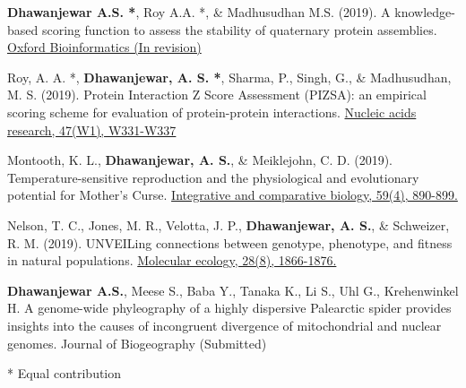 


\begin{cvpubs}

  \pubentry
    {\textbf{Dhawanjewar A.S. *}, Roy A.A. *, \& Madhusudhan M.S. (2019).}
	{A knowledge-based scoring function to assess the stability of quaternary protein assemblies.}
	{\href{https://doi.org/10.1101/562520}{Oxford Bioinformatics (In revision)}} 
	
  \pubentry
     {Roy, A. A. *, \textbf{Dhawanjewar, A. S. *}, Sharma, P., Singh, G., \& Madhusudhan, M. S. (2019).}
  	{Protein Interaction Z Score Assessment (PIZSA): an empirical scoring scheme for evaluation of protein-protein interactions.} 
	{\href{https://doi.org/10.1093/nar/gkz368}{Nucleic acids research, 47(W1), W331-W337}}

  \pubentry
    {Montooth, K. L., \textbf{Dhawanjewar, A. S.}, \& Meiklejohn, C. D. (2019).}
	{Temperature-sensitive reproduction and the physiological and evolutionary potential for Mother's Curse.}	{\href{https://doi.org/10.1093/icb/icz091}{Integrative and comparative biology, 59(4), 890-899.}}

  \pubentry
    {Nelson, T. C., Jones, M. R., Velotta, J. P., \textbf{Dhawanjewar, A. S.}, \& Schweizer, R. M. (2019).}
	{UNVEILing connections between genotype, phenotype, and fitness in natural populations.}
	{\href{https://doi.org/10.1111/mec.15067}{Molecular ecology, 28(8), 1866-1876.}}
	
  \pubentry
  	{\textbf{Dhawanjewar A.S.}, Meese S., Baba Y., Tanaka K., Li S., Uhl G., Krehenwinkel H.}
  	{A genome-wide phyleography of a highly dispersive Palearctic spider provides insights into the causes of incongruent divergence of mitochondrial and nuclear genomes.}
  	{Journal of Biogeography (Submitted)}
	
	* Equal contribution

\end{cvpubs}
